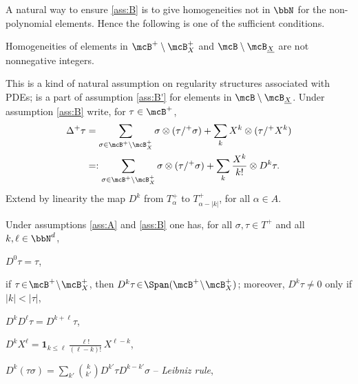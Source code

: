 A natural way to ensure \eqref{ass:B} is to give homogeneities not in $\bbN$ for the non-polynomial elements.
Hence the following is one of the sufficient conditions.

\bgroup
\addtocounter{assumption}{-1}
\renewcommand{\theassumption}{\Alph{assumption}'}\begin{assumption}\label{ass:B'}
Homogeneities of elements in $\mcB^+\setminus\mcB_X^+$ and $\mcB\setminus\mcB_{\underline{X}}$ are not nonnegative integers.
\end{assumption}
\egroup

This is a kind of natural assumption on regularity structures associated with PDEs; \cite[Ass.\,5.3]{Hai} is a part of assumption \eqref{ass:B'} for elements in $\mcB\setminus\mcB_{\underline{X}}$. Under assumption \eqref{ass:B} write, for $\tau\in\mcB^+$,
\begin{equation}\label{def of D^ktau}
\begin{split}
\Delta^+\tau &= \sum_{\sigma\in\mcB^+\setminus\mcB_X^+}\sigma\otimes(\tau/^+\sigma) + \sum_{k}X^k\otimes(\tau/^+X^k) \\
&=: \sum_{\sigma\in\mcB^+\setminus\mcB_X^+}\sigma\otimes(\tau/^+\sigma) + \sum_{k}\frac{X^k}{k!}\otimes D^k\tau.
\end{split}
\end{equation}
Extend by linearity the map $D^k$ from $T_\alpha^+$ to $T_{\alpha-|k|}^+$, for all $\alpha\in A$.

\begin{lem}\label{lem:recursive rules}
Under assumptions \eqref{ass:A} and \eqref{ass:B} one has, for all $\sigma,\tau\in T^+$ and all $k,\ell\in\bbN^d$,
\begin{enumeratea}
	\item\label{lem:recursive rulesa} $D^0\tau = \tau$,
	
	\item\label{lem:recursive rulesb} if $\tau\!\in\!\mcB^+\!\setminus\!\mcB_X^+$, then $D^k\tau\!\in\!\Span (\mcB^+\!\setminus\!\mcB_X^+)$;
	moreover, $D^k\tau\!\neq\! 0$ only if $|k|\!<\!|\tau|$,
		
	\item\label{lem:recursive rulesc} $D^{k}D^\ell\tau = D^{k+\ell}\tau$,

	\item\label{lem:recursive rulesd} $D^{k}X^\ell = \mathbf{1}_{k\le \ell}\, \frac{\ell!}{(\ell-k)!} \, X^{\ell-k}$,
	
	\item\label{lem:recursive rulese} $D^k(\tau\sigma) = \sum_{k'} \binom{k}{k'} D^{k'}\tau D^{k-k'}\sigma$ -- {\sl Leibniz rule},
\end{enumeratea}
\end{lem}

